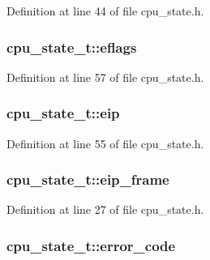 \-Definition at line 44 of file cpu\-\_\-state.\-h.

\hypertarget{structcpu__state__t_a3c71809af7c0797995f491b253dca172}{
\subsubsection[{eflags}]{ {\bf cpu\-\_\-state\-\_\-t\-::eflags}}}\label{structcpu__state__t_a3c71809af7c0797995f491b253dca172}


\-Definition at line 57 of file cpu\-\_\-state.\-h.

\hypertarget{structcpu__state__t_a677f73c40aa87d3eef8eadf4ebdc39f8}{
\subsubsection[{eip}]{ {\bf cpu\-\_\-state\-\_\-t\-::eip}}}\label{structcpu__state__t_a677f73c40aa87d3eef8eadf4ebdc39f8}


\-Definition at line 55 of file cpu\-\_\-state.\-h.

\hypertarget{structcpu__state__t_a137384266091045c2336b1fd8d5e2de8}{
\subsubsection[{eip\-\_\-frame}]{ {\bf cpu\-\_\-state\-\_\-t\-::eip\-\_\-frame}}}\label{structcpu__state__t_a137384266091045c2336b1fd8d5e2de8}


\-Definition at line 27 of file cpu\-\_\-state.\-h.

\hypertarget{structcpu__state__t_a2cff0114464d473d87b82292e11c3b90}{
\subsubsection[{error\-\_\-code}]{ {\bf cpu\-\_\-state\-\_\-t\-::error\-\_\-code}}}\label{structcpu__state__t_a2cff0114464d473d87b82292e11c3b90}


